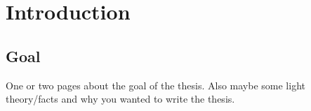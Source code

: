 \chapter{Introduction}

\section{Goal}
One or two pages about the goal of the thesis. Also maybe some light
theory/facts and why you wanted to write the thesis.
